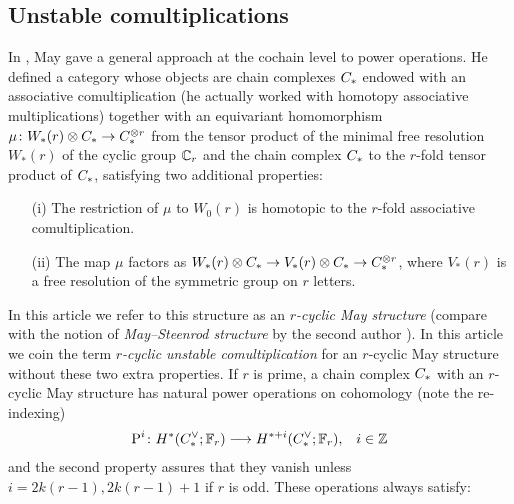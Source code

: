 \subsection{Unstable comultiplications} In \cite{may1970general}, May gave a general approach at the cochain level to power operations. He defined a category whose objects are chain complexes $C_{*}$ endowed with an associative comultiplication (he actually worked with homotopy associative multiplications) together with an equivariant homomorphism $\mu\colon W_*(r)\otimes C_{*}\to C_{*}^{\otimes r}$ from the tensor product of the minimal free resolution $W_*(r)$ of the cyclic group $\mathbb{C}_r$ and the chain complex $C_{*}$ to the $r$-fold tensor product of $C_{*}$, satisfying two additional properties:
\begin{itemize}
	\item[(i)] The restriction of $\mu$ to $W_0(r)$ is homotopic to the $r$-fold associative comultiplication.
	\item[(ii)] The map $\mu$ factors as $W_*(r)\otimes C_{*} \to V_*(r)\otimes C_{*}\to C_{*}^{\otimes r}$, where $V_*(r)$ is a free resolution of the symmetric group on $r$ letters.
\end{itemize}
In this article we refer to this structure as an \emph{$r$-cyclic May structure} (compare with the notion of \emph{May--Steenrod structure} by the second author \cite{medina2021may_st}). In this article we coin the term \emph{$r$-cyclic unstable comultiplication} for an $r$-cyclic May structure without these two extra properties. If $r$ is prime, a chain complex $C_{*}$ with an $r$-cyclic May structure has natural power operations on cohomology (note the re-indexing)
\begin{align*}
	\operatorname{P}^i\colon H^*(C^\vee_{*};\mathbb{F}_r)&\longrightarrow H^{*+i}(C^\vee_{*};\mathbb{F}_r), & i\in \mathbb{Z}
\end{align*}
and the second property assures that they vanish unless $i = 2k(r-1), 2k(r-1)+1$ if $r$ is odd.
These operations always satisfy:
